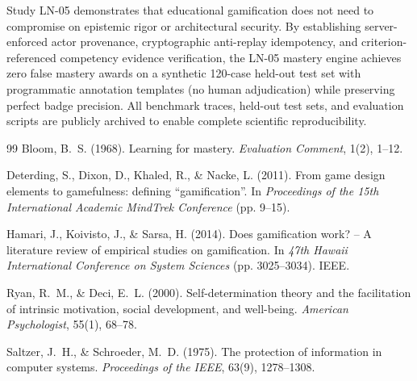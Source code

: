 \documentclass[11pt,a4paper]{article}
\begin{document}
Study LN-05 demonstrates that educational gamification does not need to compromise on epistemic rigor or architectural security. By establishing server-enforced actor provenance, cryptographic anti-replay idempotency, and criterion-referenced competency evidence verification, the LN-05 mastery engine achieves zero false mastery awards on a synthetic 120-case held-out test set with programmatic annotation templates (no human adjudication) while preserving perfect badge precision. All benchmark traces, held-out test sets, and evaluation scripts are publicly archived to enable complete scientific reproducibility.

\begin{thebibliography}{99}
Bloom, B.~S. (1968). Learning for mastery. \textit{Evaluation Comment}, 1(2), 1--12.

Deterding, S., Dixon, D., Khaled, R., \& Nacke, L. (2011). From game design elements to gamefulness: defining ``gamification''. In \textit{Proceedings of the 15th International Academic MindTrek Conference} (pp. 9--15).

Hamari, J., Koivisto, J., \& Sarsa, H. (2014). Does gamification work? -- A literature review of empirical studies on gamification. In \textit{47th Hawaii International Conference on System Sciences} (pp. 3025--3034). IEEE.

Ryan, R.~M., \& Deci, E.~L. (2000). Self-determination theory and the facilitation of intrinsic motivation, social development, and well-being. \textit{American Psychologist}, 55(1), 68--78.

Saltzer, J.~H., \& Schroeder, M.~D. (1975). The protection of information in computer systems. \textit{Proceedings of the IEEE}, 63(9), 1278--1308.
\end{thebibliography}
\end{document}

